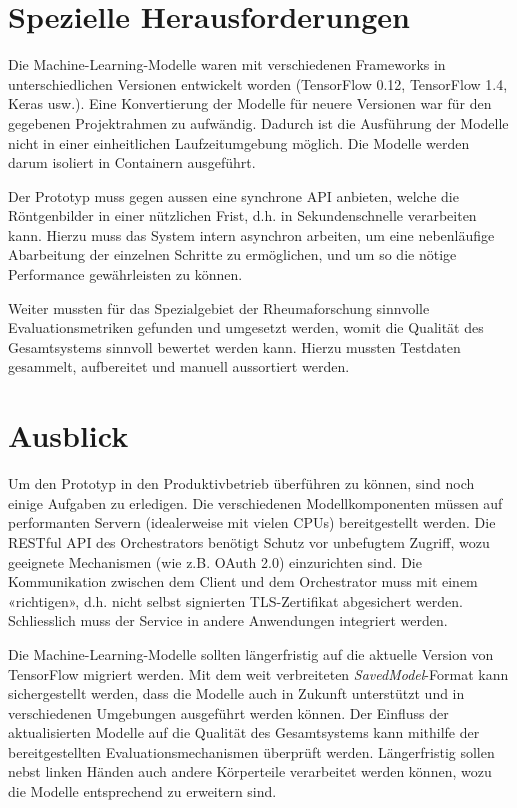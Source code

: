 \documentclass[a4paper,10pt,hidelinks]{scrartcl}
\begin{document}
\section{\fontsize{14}{16}\selectfont Spezielle Herausforderungen}

Die Machine-Learning-Modelle waren mit verschiedenen Frameworks in unterschiedlichen Versionen entwickelt worden (TensorFlow 0.12, TensorFlow 1.4, Keras usw.). Eine Konvertierung der Modelle für neuere Versionen war für den gegebenen Projektrahmen zu aufwändig. Dadurch ist die Ausführung der Modelle nicht in einer einheitlichen Laufzeitumgebung möglich. Die Modelle werden darum isoliert in Containern ausgeführt.

Der Prototyp muss gegen aussen eine synchrone API anbieten, welche die Röntgenbilder in einer nützlichen Frist, d.h. in Sekundenschnelle verarbeiten kann. Hierzu muss das System intern asynchron arbeiten, um eine nebenläufige Abarbeitung der einzelnen Schritte zu ermöglichen, und um so die nötige Performance gewährleisten zu können.

Weiter mussten für das Spezialgebiet der Rheumaforschung sinnvolle Evaluationsmetriken gefunden und umgesetzt werden, womit die Qualität des Gesamtsystems sinnvoll bewertet werden kann. Hierzu mussten Testdaten gesammelt, aufbereitet und manuell aussortiert werden.

\section{\fontsize{14}{16}\selectfont Ausblick}

Um den Prototyp in den Produktivbetrieb überführen zu können, sind noch einige Aufgaben zu erledigen. Die verschiedenen Modellkomponenten müssen auf performanten Servern (idealerweise mit vielen CPUs) bereitgestellt werden. Die RESTful API des Orchestrators benötigt Schutz vor unbefugtem Zugriff, wozu geeignete Mechanismen (wie z.B. OAuth 2.0) einzurichten sind. Die Kommunikation zwischen dem Client und dem Orchestrator muss mit einem «richtigen», d.h. nicht selbst signierten TLS-Zertifikat abgesichert werden. Schliesslich muss der Service in andere Anwendungen integriert werden.

Die Machine-Learning-Modelle sollten längerfristig auf die aktuelle Version von TensorFlow migriert werden. Mit dem weit verbreiteten \textit{SavedModel}-Format kann sichergestellt werden, dass die Modelle auch in Zukunft unterstützt und in verschiedenen Umgebungen ausgeführt werden können. Der Einfluss der aktualisierten Modelle auf die Qualität des Gesamtsystems kann mithilfe der bereitgestellten Evaluationsmechanismen überprüft werden. Längerfristig sollen nebst linken Händen auch andere Körperteile verarbeitet werden können, wozu die Modelle entsprechend zu erweitern sind.
\end{document}
